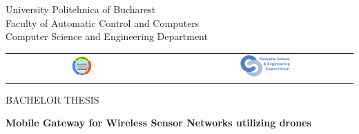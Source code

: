 

\pagestyle{empty}
\sffamily

\noindent
\begin{center}
    \Large
    University Politehnica of Bucharest\\
    Faculty of Automatic Control and Computers \\
    Computer Science and Engineering Department \\
\end{center}

		\par\vspace*{3mm}
		\begin{table}[h]
        	\begin{center}
				\begin{tabular}{cccc}
                    \includegraphics[width=0.13\textwidth]{frontbackstyle/upb}
					& & &
					\includegraphics[width=0.30\textwidth]{frontbackstyle/cs}
            	\end{tabular}
			\end{center}
		\end{table}
		
		\par\vspace*{15mm}

\begin{center}
    \Large
    BACHELOR THESIS\\
\end{center}

\vfill
\begin{center}
	\HUGE\bfseries
	Mobile Gateway for Wireless Sensor Networks utilizing drones\\
\vfill
	\large
	
\end{center}

